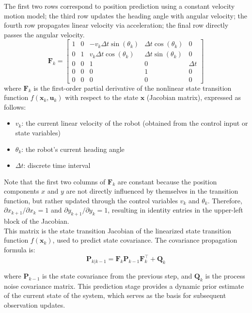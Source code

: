 \documentclass[12pt,a4paper]{article}
\numberwithin{equation}{section}
\begin{document}
The first two rows correspond to position prediction using a constant velocity motion model; the third row updates the heading angle with angular velocity; the fourth row propagates linear velocity via acceleration; the final row directly passes the angular velocity.
\begin{equation}
\mathbf{F}_k = 
\begin{bmatrix}
1 & 0 & -v_k \Delta t \sin(\theta_k) & \Delta t \cos(\theta_k) & 0 \\
0 & 1 & v_k \Delta t \cos(\theta_k) & \Delta t \sin(\theta_k) & 0 \\
0 & 0 & 1 & 0 & \Delta t \\
0 & 0 & 0 & 1 & 0 \\
0 & 0 & 0 & 0 & 0
\end{bmatrix}
\label{eq:jacobian_F}
\end{equation}
\noindent where $\mathbf{F}_k$ is the first-order partial derivative of the nonlinear state transition function $f(\mathbf{x}_k, \mathbf{u}_k)$ with respect to the state $\mathbf{x}$ (Jacobian matrix), expressed as follows:
\begin{itemize}
\item $v_k$: the current linear velocity of the robot (obtained from the control input or state variables)
\item $\theta_k$: the robot's current heading angle
\item $\Delta t$: discrete time interval
\end{itemize}
Note that the first two columns of $\mathbf{F}_k$ are constant because the position components $x$ and $y$ are not directly influenced by themselves in the transition function, but rather updated through the control variables $v_k$ and $\theta_k$. Therefore, $\partial x_{k+1} / \partial x_k = 1$ and $\partial y_{k+1} / \partial y_k = 1$, resulting in identity entries in the upper-left block of the Jacobian.\\
This matrix is the state transition Jacobian of the linearized state transition function $f(\mathbf{x}_k)$, used to predict state covariance.
The covariance propagation formula is:
\begin{equation}
\mathbf{P}_{k|k-1} = \mathbf{F}_k \mathbf{P}_{k-1} \mathbf{F}_k^\top + \mathbf{Q}_k
\label{eq:cov_prediction}
\end{equation}

\noindent where $\mathbf{P}_{k-1}$ is the state covariance from the previous step, and $\mathbf{Q}_k$ is the process noise covariance matrix. This prediction stage provides a dynamic prior estimate of the current state of the system, which serves as the basis for subsequent observation updates.
\end{document}
